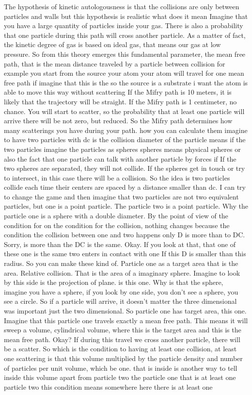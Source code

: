 The hypothesis of kinetic autologousness is that the collisions are only between particles and walls but this hypothesis is realistic what does it mean Imagine that you have a large quantity of particles inside your gas. There is also a probability that one particle during this path will cross another particle. As a matter of fact, the kinetic degree of gas is based on ideal gas, that means our gas at low pressure. So from this theory emerges this fundamental parameter, the mean free path, that is the mean distance traveled by a particle between collision for example you start from the source your atom your atom will travel for one mean free path if imagine that this is the so the source is a substrate i want the atom is able to move this way without scattering If the Mifry path is 10 meters, it is likely that the trajectory will be straight. If the Mifry path is 1 centimeter, no chance. You will start to scatter, so the probability that at least one particle will arrive there will be not zero, but reduced. So the Mifry path determines how many scatterings you have during your path. how you can calculate them imagine to have two particles with dc is the collision diameter of the particle means if the two particles imagine the particles as spheres spheres means physical spheres or also the fact that one particle can talk with another particle by forces if If the two spheres are separated, they will not collide. If the spheres get in touch or try to intersect, in this case there will be a collision. So the idea is two particles collide each time their centers are spaced by a distance smaller than dc. I can try to change the game and then imagine that two particles are not two equivalent particles, but one is a point particle. The particle two is a point particle. Why the particle one is a sphere with a double diameter. By the point of view of the condition for on the condition for the collision, nothing changes because the condition the collision between one and two happens only D is more than to DC. Sorry, is more than the DC is the same. Okay. If you look at that, that one of these one is the same two enters in contact with one If this D is smaller than this radius. So you can make these kind of. Particle one as a target area that is the area. Relative collision. That is the area of a imaginary sphere. Imagine to look by this side is the projection of plane. is this one. Why is that the sphere, imagine you have a sphere, if you look by one side, you don't see a sphere, you see a circle. So if a particle will arrive, it doesn't matter the three dimensional was important just the two dimensional. So particle one has target area, this one. Imagine that this particle one travels exactly a mean free path. This means it will sweep a volume, cylindrical volume, where this is the target area and this is the mean free path. Okay? If during this travel we cross another particle, there will be a scatter. So which is the condition to having at least one collision, at least one scattering is that this volume multiplied by the particle density and number of particles per unit volume, which be one. that is inside is another way to tell inside this volume apart from particle two the particle one that is at least one particle two this condition means somewhere here there is at least one 